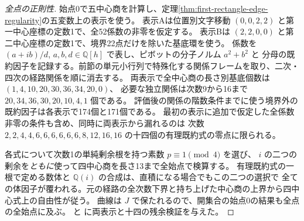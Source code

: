 \begin{proof}[全点の正則性]
始点0で五中心商を計算し、定理\ref{thm:first-rectangle-edge-regularity}の五変数上の表示を使う。
表示Aは位置別文字移動 $(0,0,2,2)$ と第一中心座標の定数1で、全52係数の非零を仮定する。
表示Bは $(2,2,0,0)$ と第二中心座標の定数1で、境界22点だけを除いた基底環を使う。
係数を $(a+ib)/d$, $a,b,d\in\mathbb Q[h]$ で表し、ピボットの分子ノルム $a^2+b^2$ と
分母の既約因子を記録する。前節の単元小行列で特殊化する関係フレームを取り、二次・四次の経路関係を順に消去する。
両表示で全中心商の長さ別基底個数は $(1,4,10,20,30,36,34,20,0)$、
必要な独立関係は次数9から16まで $20,34,36,30,20,10,4,1$ 個である。
評価後の関係の階数条件までに使う境界外の既約因子は各表示で174個と171個である。
最初の表示に追加で仮定した全係数非零の条件も含め、同時に両表示から漏れるのは
次数 $2,2,4,4,6,6,6,6,6,6,8,12,16,16$ の十四個の有理既約式の零点に限られる。

各式について次数1の単純剰余根を持つ素数 $p\equiv1\pmod4$ を選び、
$i$ の二つの剰余を\emph{ともに}使って四中心商を長さ13まで全始点で検算する。
有理既約式の一根で定める数体と $\mathbb Q(i)$ の合成は、直積になる場合でもこの二つの選択で
全ての体因子が覆われる。元の経路の全次数下界と持ち上げた中心商の上界から四中心式上の自由性が従う。
曲線は $J$ で保たれるので、開集合の始点0の結果も全点の全始点に及ぶ。
 と
 に両表示と十四の残余検証を与えた。
\end{proof}
